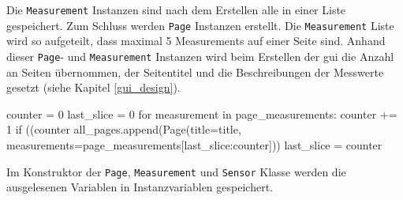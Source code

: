 Die \lstinline{Measurement} Instanzen sind nach dem Erstellen alle in einer Liste gespeichert. Zum Schluss werden \lstinline{Page} Instanzen erstellt. Die \lstinline{Measurement} Liste wird so aufgeteilt, dass maximal 5 Measurements auf einer Seite sind. Anhand dieser \lstinline{Page}- und \lstinline{Measurement} Instanzen wird beim Erstellen der \acs{gui} die Anzahl an Seiten übernommen, der Seitentitel und die Beschreibungen der Messwerte gesetzt (siehe Kapitel \ref{gui_design}). 
\begin{pythoncode}
counter = 0
last_slice = 0
for measurement in page_measurements:
	counter += 1
	if ((counter %
		all_pages.append(Page(title=title, measurements=page_measurements[last_slice:counter]))
		last_slice = counter
\end{pythoncode}


Im Konstruktor der \lstinline{Page}, \lstinline{Measurement} und \lstinline{Sensor} Klasse werden die ausgelesenen Variablen in Instanzvariablen gespeichert.